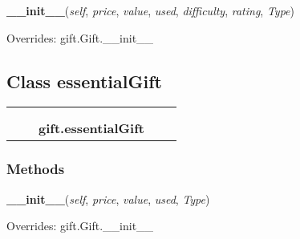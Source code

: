     \vspace{0.5ex}

\hspace{.8\funcindent}\begin{boxedminipage}{\funcwidth}

    \raggedright \textbf{\_\_init\_\_}(\textit{self}, \textit{price}, \textit{value}, \textit{used}, \textit{difficulty}, \textit{rating}, \textit{Type})

\setlength{\parskip}{2ex}
\setlength{\parskip}{1ex}
      Overrides: gift.Gift.\_\_init\_\_

    \end{boxedminipage}



\subsection{Class essentialGift}

    \label{gift:essentialGift}
\begin{tabular}{cccccc}
\multicolumn{2}{r}{\settowidth{\BCL}{gift.Gift}\multirow{2}{\BCL}{gift.Gift}}
&&
  \\\cline{3-3}
  &&\multicolumn{1}{c|}{}
&&
  \\
&&\multicolumn{2}{l}{\textbf{gift.essentialGift}}
\end{tabular}



  \subsubsection{Methods}

    \vspace{0.5ex}

\hspace{.8\funcindent}\begin{boxedminipage}{\funcwidth}

    \raggedright \textbf{\_\_init\_\_}(\textit{self}, \textit{price}, \textit{value}, \textit{used}, \textit{Type})

\setlength{\parskip}{2ex}
\setlength{\parskip}{1ex}
      Overrides: gift.Gift.\_\_init\_\_

    \end{boxedminipage}

